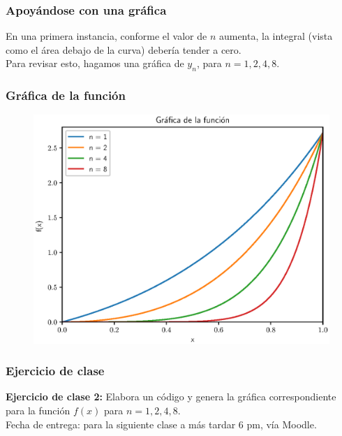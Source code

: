 \documentclass[12pt]{beamer}
\begin{document}
\begin{frame}
\frametitle{Apoyándose con una gráfica}
En una primera instancia, conforme el valor de $n$ aumenta, la integral (vista como el área debajo de la curva) debería tender a cero.
\\
\bigskip
\pause
Para revisar esto, hagamos una gráfica de $y_{n}$, para $n = 1, 2, 4, 8$.
\end{frame}
\begin{frame}
\frametitle{Gráfica de la función}
\begin{figure}
	\centering
	\includegraphics[scale=0.6]{Imagenes/Estabilidad_02.eps}
\end{figure}
\end{frame}
\begin{frame}
\frametitle{Ejercicio de clase}
\textbf{Ejercicio de clase 2:} Elabora un código y genera la gráfica correspondiente para la función $f(x)$ para $n = 1, 2, 4, 8$.
\\
\bigskip
\pause
Fecha de entrega: para la siguiente clase a más tardar 6 pm, vía Moodle.
\end{frame}




\end{document}
